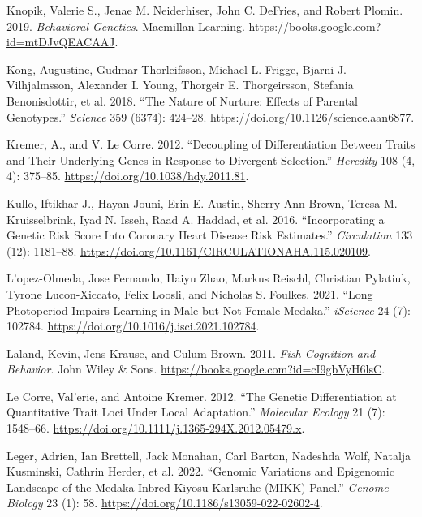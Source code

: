 \documentclass[
]{book}
\newlength{\cslhangindent}
\newlength{\cslentryspacingunit} %
\newenvironment{CSLReferences}[2] %
 {%
  \setlength{\parindent}{0pt}
  \ifodd #1
  \let\oldpar\par
  \def\par{\hangindent=\cslhangindent\oldpar}
  \fi
  \setlength{\parskip}{#2\cslentryspacingunit}
 }%
 {}
\begin{document}
\begin{CSLReferences}{1}{0}
\leavevmode{}%
Knopik, Valerie S., Jenae M. Neiderhiser, John C. DeFries, and Robert Plomin. 2019. \emph{Behavioral {Genetics}}. {Macmillan Learning}. \url{https://books.google.com?id=mtDJvQEACAAJ}.

\leavevmode{}%
Kong, Augustine, Gudmar Thorleifsson, Michael L. Frigge, Bjarni J. Vilhjalmsson, Alexander I. Young, Thorgeir E. Thorgeirsson, Stefania Benonisdottir, et al. 2018. {``The Nature of Nurture: {Effects} of Parental Genotypes.''} \emph{Science} 359 (6374): 424--28. \url{https://doi.org/10.1126/science.aan6877}.

\leavevmode{}%
Kremer, A., and V. Le Corre. 2012. {``Decoupling of Differentiation Between Traits and Their Underlying Genes in Response to Divergent Selection.''} \emph{Heredity} 108 (4, 4): 375--85. \url{https://doi.org/10.1038/hdy.2011.81}.

\leavevmode{}%
Kullo, Iftikhar J., Hayan Jouni, Erin E. Austin, Sherry-Ann Brown, Teresa M. Kruisselbrink, Iyad N. Isseh, Raad A. Haddad, et al. 2016. {``Incorporating a {Genetic Risk Score Into Coronary Heart Disease Risk Estimates}.''} \emph{Circulation} 133 (12): 1181--88. \url{https://doi.org/10.1161/CIRCULATIONAHA.115.020109}.

\leavevmode{}%
L'opez-Olmeda, Jose Fernando, Haiyu Zhao, Markus Reischl, Christian Pylatiuk, Tyrone Lucon-Xiccato, Felix Loosli, and Nicholas S. Foulkes. 2021. {``Long Photoperiod Impairs Learning in Male but Not Female Medaka.''} \emph{iScience} 24 (7): 102784. \url{https://doi.org/10.1016/j.isci.2021.102784}.

\leavevmode{}%
Laland, Kevin, Jens Krause, and Culum Brown. 2011. \emph{Fish {Cognition} and {Behavior}}. {John Wiley \& Sons}. \url{https://books.google.com?id=cI9gbVyH6lsC}.

\leavevmode{}%
Le Corre, Val'erie, and Antoine Kremer. 2012. {``The Genetic Differentiation at Quantitative Trait Loci Under Local Adaptation.''} \emph{Molecular Ecology} 21 (7): 1548--66. \url{https://doi.org/10.1111/j.1365-294X.2012.05479.x}.

\leavevmode{}%
Leger, Adrien, Ian Brettell, Jack Monahan, Carl Barton, Nadeshda Wolf, Natalja Kusminski, Cathrin Herder, et al. 2022. {``Genomic Variations and Epigenomic Landscape of the {Medaka Inbred Kiyosu-Karlsruhe} ({MIKK}) Panel.''} \emph{Genome Biology} 23 (1): 58. \url{https://doi.org/10.1186/s13059-022-02602-4}.


\end{CSLReferences}
\end{document}
